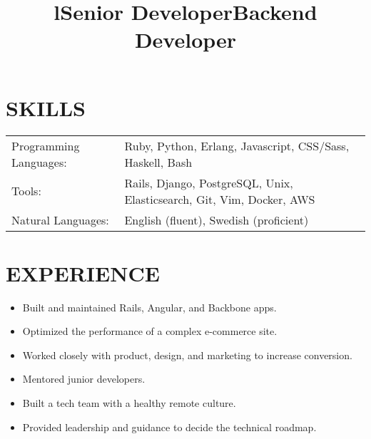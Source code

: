 \documentclass[line]{res}
\title{l}\dates{r}\\
\begin{document}
\begin{resume}

\section{SKILLS}
\begin{tabular}{ l l }
Programming Languages: &
Ruby,
Python,
Erlang,
Javascript,
CSS/Sass,
Haskell,
Bash\\

Tools: &
Rails,
Django,
PostgreSQL,
Unix,
Elasticsearch,
Git,
Vim,
Docker,
AWS\\

Natural Languages: &
English (fluent),
Swedish (proficient)
\end{tabular}

\section {EXPERIENCE}
\vspace {2 pt}

\title{Senior Developer}
\begin{position}
\noindent
\vspace {-10 pt}
\begin{itemize}

\item Built and maintained Rails, Angular, and Backbone apps.
\item Optimized the performance of a complex e-commerce site.
\item Worked closely with product, design, and marketing to increase conversion.
\item Mentored junior developers.
\item Built a tech team with a healthy remote culture.
\item Provided leadership and guidance to decide the technical roadmap.

\end{itemize}
\end{position}

\title{Backend Developer}
\begin{position}
\noindent
\vspace {-10 pt}
\begin{itemize}


\end{itemize}
\end{position}
\end{resume}
\end{document}
